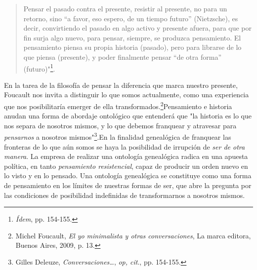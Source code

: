 \begin{quote}
Pensar el pasado contra el presente, resistir al presente, no para un
retorno, sino ``a favor, eso espero, de un tiempo futuro'' (Nietzsche),
es decir, convirtiendo el pasado en algo activo y presente afuera, para
que por fin surja algo nuevo, para pensar, siempre, se produzca
pensamiento. El pensamiento piensa su propia historia (pasado), pero
para librarse de lo que piensa (presente), y poder finalmente pensar
``de otra forma'' (futuro)"\footnote{\emph{Ídem}, pp. 154-155.}.
\end{quote}

En la tarea de la filosofía de pensar la diferencia que marca nuestro
presente, Foucault nos invita a distinguir lo que somos actualmente,
como una experiencia que nos posibilitaría emerger de ella
transformados.\footnote{Michel Foucault, \emph{El yo minimalista y otras
  conversaciones}, La marca editora, Buenos Aires, 2009, p. 13.}Pensamiento
e historia anudan una forma de abordaje ontológico que entenderá que "la
historia es lo que nos separa de nosotros mismos, y lo que debemos
franquear y atravesar para \emph{pensarnos} a nosotros
mismos"\footnote{Gilles Deleuze, \emph{Conversaciones\ldots{}},
  \emph{op, cit}., pp. 154-155.}.En la finalidad genealógica de
franquear las fronteras de lo que aún somos se haya la posibilidad de
irrupción de \emph{ser de otra manera}. La empresa de realizar una
ontología genealógica radica en una apuesta política, en tanto
\emph{pensamiento resistencial}, capaz de producir un orden nuevo en lo
visto y en lo pensado. Una ontología genealógica se constituye como una
forma de pensamiento en los límites de nuestras formas de ser, que abre
la pregunta por las condiciones de posibilidad indefinidas de
transformarnos a nosotros mismos.

